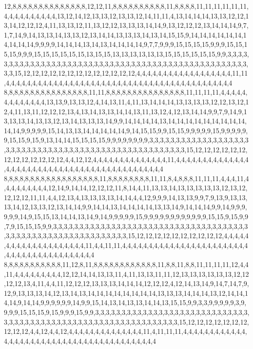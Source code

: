 12,8,8,8,8,8,8,8,8,8,8,8,8,8,8,12,12,11,8,8,8,8,8,8,8,8,8,8,11,8,8,8,8,11,11,11,11,11,11,4,4,4,4,4,4,4,4,4,4,13,12,14,12,13,13,12,13,13,12,14,11,11,4,13,14,14,14,13,13,12,12,13,14,12,12,12,4,11,13,13,12,11,13,12,12,13,13,13,14,14,9,13,12,12,12,13,14,14,14,9,7,1,7,14,9,14,13,13,14,13,13,12,13,14,14,13,13,13,14,13,14,15,15,9,14,14,14,14,14,14,14,14,14,14,9,9,9,9,14,14,14,13,14,13,14,14,14,14,9,7,7,9,9,9,15,15,15,15,9,9,9,15,15,15,15,9,9,9,15,15,15,15,15,15,13,15,15,13,13,13,13,13,13,15,15,15,15,15,15,9,9,3,3,3,3,3,3,3,3,3,3,3,3,3,3,3,3,3,3,3,3,3,3,3,3,3,3,3,3,3,3,3,3,3,3,3,3,3,3,3,3,3,3,3,3,3,3,3,3,3,3,3,3,15,12,12,12,12,12,12,12,12,12,12,12,12,12,4,4,4,4,4,4,4,4,4,4,4,4,4,4,4,4,4,4,11,11,4,4,4,4,4,4,4,4,4,4,4,4,4,4,4,4,4,4,4,4,4,4,4,4,4,4,4,4,4,4,4,4,4,4,4,4,4,4,4,4,4,4,4
8,8,8,8,8,8,8,8,8,8,8,8,8,8,8,8,11,11,8,8,8,8,8,8,8,8,8,8,8,8,8,8,8,11,11,11,11,4,4,4,4,4,4,4,4,4,4,4,4,4,13,13,9,13,13,12,4,14,13,11,4,11,13,14,14,14,13,13,13,13,12,12,13,12,12,4,11,13,11,12,12,12,13,4,13,14,13,13,14,14,13,11,13,12,4,12,13,14,14,9,9,7,9,14,9,13,13,13,14,13,13,12,13,14,13,13,13,14,9,9,14,14,14,14,13,14,14,14,14,14,14,14,14,14,14,14,9,9,9,9,9,15,14,13,13,14,14,14,14,14,9,14,15,15,9,9,15,15,9,9,9,9,9,15,9,9,9,9,9,9,15,15,9,15,9,13,14,14,15,15,15,15,9,9,9,9,9,9,9,9,3,3,3,3,3,3,3,3,3,3,3,3,3,3,3,3,3,3,3,3,3,3,3,3,3,3,3,3,3,3,3,3,3,3,3,3,3,3,3,3,3,3,3,3,3,3,3,3,3,3,3,3,3,15,12,12,12,12,12,12,12,12,12,12,12,12,12,4,4,12,12,4,4,4,4,4,4,4,4,4,4,4,4,4,4,11,4,4,4,4,4,4,4,4,4,4,4,4,4,4,4,4,4,4,4,4,4,4,4,4,4,4,4,4,4,4,4,4,4,4,4,4,4,4,4,4,4,4,4,4
8,8,8,8,8,8,8,8,8,8,8,8,8,8,8,8,8,8,11,8,8,8,8,8,8,8,8,11,11,8,4,8,8,8,11,11,11,4,4,4,11,4,4,4,4,4,4,4,4,4,12,14,9,14,14,12,12,12,11,8,14,4,11,13,13,14,13,13,13,13,13,12,13,12,12,12,12,11,11,4,4,12,13,4,13,13,13,13,14,14,4,4,12,9,9,9,14,13,13,9,9,7,9,13,9,13,13,13,14,12,13,13,12,13,14,14,9,9,14,14,13,14,14,14,14,13,13,14,9,14,14,14,9,9,14,9,9,9,9,9,9,14,9,15,15,13,14,14,13,14,9,14,9,9,9,9,9,15,9,9,9,9,9,9,9,9,9,9,9,9,15,15,9,15,9,9,7,9,15,15,15,9,9,3,3,3,3,3,3,3,3,3,3,3,3,3,3,3,3,3,3,3,3,3,3,3,3,3,3,3,3,3,3,3,3,3,3,3,3,3,3,3,3,3,3,3,3,3,3,3,3,3,3,3,3,3,3,3,3,3,3,3,3,15,12,12,12,12,12,12,12,12,12,12,4,4,4,4,4,4,4,4,4,4,4,4,4,4,4,4,4,4,4,4,11,4,4,11,11,4,4,4,4,4,4,4,4,4,4,4,4,4,4,4,4,4,4,4,4,4,4,4,4,4,4,4,4,4,4,4,4,4,4,4,4,4,4,4,4,4
8,8,8,8,8,8,8,8,8,8,8,11,12,8,11,8,8,8,8,8,8,8,8,8,8,8,8,11,8,8,11,8,8,11,11,11,11,12,4,4,11,4,4,4,4,4,4,4,4,4,12,12,14,14,13,13,11,4,11,13,13,11,11,12,13,13,13,13,13,13,12,12,12,12,13,4,11,4,4,11,12,12,12,13,13,13,14,14,14,12,12,12,4,12,14,13,14,9,14,7,14,7,9,12,9,13,13,13,14,12,13,14,13,14,14,14,14,14,14,14,14,13,13,13,14,14,14,13,12,14,14,14,14,9,14,14,9,9,9,9,9,9,14,9,9,15,14,13,14,13,13,14,14,13,15,15,9,9,3,3,9,9,9,9,9,3,9,9,9,9,15,15,15,9,15,9,9,9,15,9,9,3,3,3,3,3,3,3,3,3,3,3,3,3,3,3,3,3,3,3,3,3,3,3,3,3,3,3,3,3,3,3,3,3,3,3,3,3,3,3,3,3,3,3,3,3,3,3,3,3,3,3,3,3,3,3,3,3,3,3,3,3,3,15,12,12,12,12,12,12,12,12,12,12,4,4,12,4,4,12,4,4,4,4,4,4,4,4,4,4,4,4,4,4,11,4,11,11,11,4,4,4,4,4,4,4,4,4,4,4,4,4,4,4,4,4,4,4,4,4,4,4,4,4,4,4,4,4,4,4,4,4,4,4,4,4,4,4,4,4
